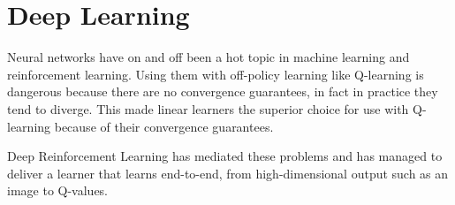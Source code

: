 \section{Deep Learning}
Neural networks have on and off
been a hot topic in machine learning and reinforcement learning.
Using them with off-policy learning like Q-learning
is dangerous because there are no convergence guarantees,
in fact in practice they tend to diverge.
This made linear learners the superior choice
for use with Q-learning
because of their convergence guarantees.

Deep Reinforcement Learning has mediated these problems
and has managed to deliver a learner
that learns end-to-end,
from high-dimensional output such as an image
to Q-values.